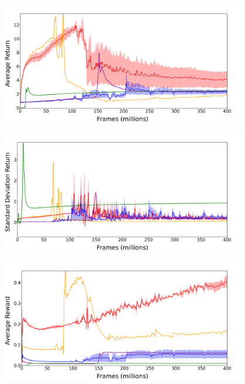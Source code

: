 \documentclass[draft,final]{vutinfth} %
\begin{document}
    \begin{figure}[H]
        \centering
        \includegraphics[width=0.95\textwidth]{figures/montezuma/long/MontezumaRevenge_retmean.png}
    \end{figure}

\newpage
    \begin{figure}[H]
        \centering
        \includegraphics[width=0.95\textwidth]{figures/montezuma/long/MontezumaRevenge_retstd.png}
    \end{figure}

    \begin{figure}[H]
        \centering
        \includegraphics[width=0.95\textwidth]{figures/montezuma/long/MontezumaRevenge_rew_mean.png}
    \end{figure}
\end{document}
